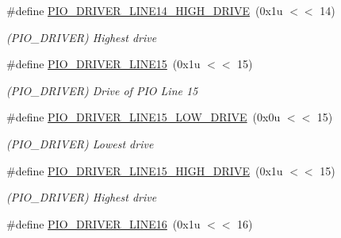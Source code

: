 \begin{DoxyCompactItemize}
\mbox{\label{group__SAMV71__PIO_ga2812fefb709cb1a6dfad63c66f51eee7}} 
\#define \mbox{\hyperlink{group__SAMV71__PIO_ga2812fefb709cb1a6dfad63c66f51eee7}{P\+I\+O\+\_\+\+D\+R\+I\+V\+E\+R\+\_\+\+L\+I\+N\+E14\+\_\+\+H\+I\+G\+H\+\_\+\+D\+R\+I\+VE}}~(0x1u $<$$<$ 14)
\begin{DoxyCompactList}\small\item\em (P\+I\+O\+\_\+\+D\+R\+I\+V\+ER) Highest drive \end{DoxyCompactList}\item 
\mbox{\label{group__SAMV71__PIO_ga0da1e179018b5680686ab073dbfc2fdc}} 
\#define \mbox{\hyperlink{group__SAMV71__PIO_ga0da1e179018b5680686ab073dbfc2fdc}{P\+I\+O\+\_\+\+D\+R\+I\+V\+E\+R\+\_\+\+L\+I\+N\+E15}}~(0x1u $<$$<$ 15)
\begin{DoxyCompactList}\small\item\em (P\+I\+O\+\_\+\+D\+R\+I\+V\+ER) Drive of P\+IO Line 15 \end{DoxyCompactList}\item 
\mbox{\label{group__SAMV71__PIO_ga2e89966f83b29017dcfbd079a4de76b8}} 
\#define \mbox{\hyperlink{group__SAMV71__PIO_ga2e89966f83b29017dcfbd079a4de76b8}{P\+I\+O\+\_\+\+D\+R\+I\+V\+E\+R\+\_\+\+L\+I\+N\+E15\+\_\+\+L\+O\+W\+\_\+\+D\+R\+I\+VE}}~(0x0u $<$$<$ 15)
\begin{DoxyCompactList}\small\item\em (P\+I\+O\+\_\+\+D\+R\+I\+V\+ER) Lowest drive \end{DoxyCompactList}\item 
\mbox{\label{group__SAMV71__PIO_ga031288ff6d202d7371c58340b3754be4}} 
\#define \mbox{\hyperlink{group__SAMV71__PIO_ga031288ff6d202d7371c58340b3754be4}{P\+I\+O\+\_\+\+D\+R\+I\+V\+E\+R\+\_\+\+L\+I\+N\+E15\+\_\+\+H\+I\+G\+H\+\_\+\+D\+R\+I\+VE}}~(0x1u $<$$<$ 15)
\begin{DoxyCompactList}\small\item\em (P\+I\+O\+\_\+\+D\+R\+I\+V\+ER) Highest drive \end{DoxyCompactList}\item 
\mbox{\label{group__SAMV71__PIO_gabc260b2369f4ee40e10a348a002ca2df}} 
\#define \mbox{\hyperlink{group__SAMV71__PIO_gabc260b2369f4ee40e10a348a002ca2df}{P\+I\+O\+\_\+\+D\+R\+I\+V\+E\+R\+\_\+\+L\+I\+N\+E16}}~(0x1u $<$$<$ 16)
$$
\end{DoxyCompactItemize}
